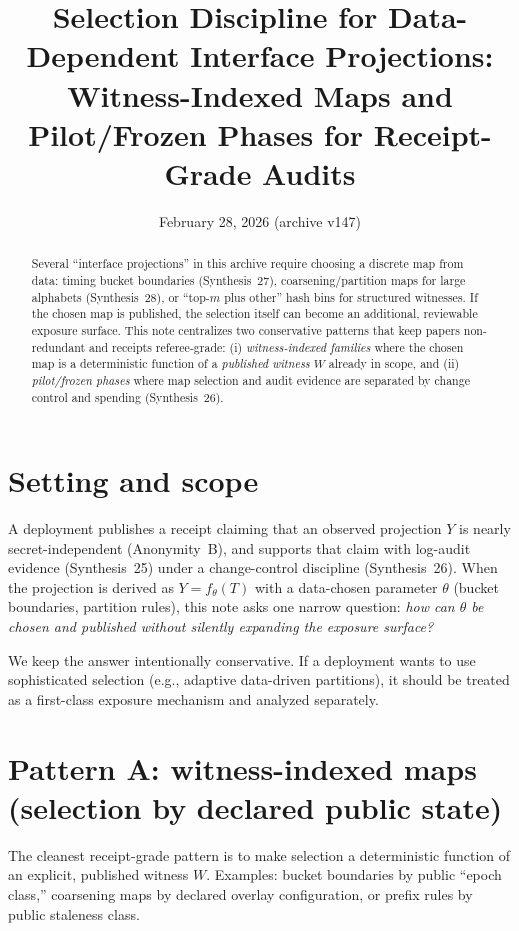 \documentclass[11pt]{article}
\title{Selection Discipline for Data-Dependent Interface Projections:\\
\large Witness-Indexed Maps and Pilot/Frozen Phases for Receipt-Grade Audits}
\author{}
\date{February 28, 2026 (archive v147)}
\begin{document}
\maketitle

\begin{abstract}
Several ``interface projections'' in this archive require choosing a discrete map from data: timing bucket boundaries (Synthesis~27),
coarsening/partition maps for large alphabets (Synthesis~28), or ``top-$m$ plus other'' hash bins for structured witnesses.
If the chosen map is published, the selection itself can become an additional, reviewable exposure surface.
This note centralizes two conservative patterns that keep papers non-redundant and receipts referee-grade:
(i) \emph{witness-indexed families} where the chosen map is a deterministic function of a \emph{published witness} $W$ already in scope,
and (ii) \emph{pilot/frozen phases} where map selection and audit evidence are separated by change control and spending (Synthesis~26).
\end{abstract}

\section{Setting and scope}
A deployment publishes a receipt claiming that an observed projection $Y$ is nearly secret-independent (Anonymity~B),
and supports that claim with log-audit evidence (Synthesis~25) under a change-control discipline (Synthesis~26).\cite{series:profiling,series:stataudit,series:anytimespend}
When the projection is derived as $Y=f_\theta(T)$ with a data-chosen parameter $\theta$ (bucket boundaries, partition rules),
this note asks one narrow question:
\emph{how can $\theta$ be chosen and published without silently expanding the exposure surface?}

We keep the answer intentionally conservative.
If a deployment wants to use sophisticated selection (e.g., adaptive data-driven partitions), it should be treated as a first-class exposure mechanism and analyzed separately.

\section{Pattern A: witness-indexed maps (selection by declared public state)}
The cleanest receipt-grade pattern is to make selection a deterministic function of an explicit, published witness $W$.
Examples: bucket boundaries by public ``epoch class,'' coarsening maps by declared overlay configuration, or prefix rules by public staleness class.
\end{document}
